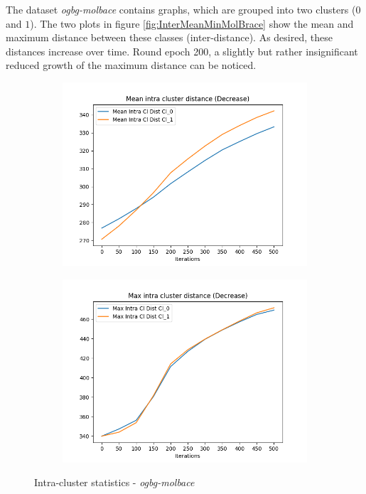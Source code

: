 		The dataset \textit{ogbg-molbace} contains graphs, which are grouped into two clusters ($0$ and $1$).
		The two plots in figure \ref{fig:InterMeanMinMolBrace} show the mean and maximum distance between these classes (inter-distance).
		As desired, these distances increase over time.
		Round epoch 200, a slightly but rather insignificant reduced growth of the maximum distance can be noticed.		
		
		\begin{figure}[!ht]
			\centering
			\begin{subfigure}{0.49\textwidth}
				\centering
				\includegraphics[width=1.1\linewidth]{images/plotA1_IntraMeanClDist_ogbgMolbaceExp1}
				\label{fig:plota1intrameancldistogbgmolbaceexp1}
			\end{subfigure}
			\begin{subfigure}{0.49\textwidth}
				\centering
				\includegraphics[width=1.1\linewidth]{images/plotA1_IntraMaxClDist_ogbgMolbaceExp1}
				\label{fig:plota1intramaxcldistogbgmolbaceexp1}
			\end{subfigure}
			\caption{Intra-cluster statistics - \textit{ogbg-molbace}}
			\label{fig:IntraMeanMaxDistMolBace}
		\end{figure}
		
